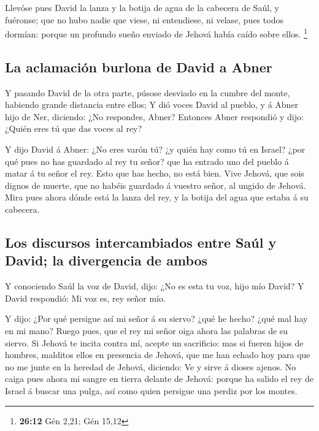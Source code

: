  Llevóse pues David la lanza y la botija de agua de la
cabecera de Saúl, y fuéronse; que no hubo nadie que viese, ni
entendiese, ni velase, pues todos dormían: porque un profundo sueño
enviado de Jehová había caído sobre ellos. \footnote{\textbf{26:12} Gén
  2,21; Gén 15,12}

\hypertarget{la-aclamaciuxf3n-burlona-de-david-a-abner}{%
\subsection{La aclamación burlona de David a
Abner}\label{la-aclamaciuxf3n-burlona-de-david-a-abner}}

 Y pasando David de la otra parte, púsose desviado en la
cumbre del monte, habiendo grande distancia entre ellos;  Y
dió voces David al pueblo, y á Abner hijo de Ner, diciendo: ¿No
respondes, Abner? Entonces Abner respondió y dijo: ¿Quién eres tú que
das voces al rey?

 Y dijo David á Abner: ¿No eres varón tú? ¿y quién hay como
tú en Israel? ¿por qué pues no has guardado al rey tu señor? que ha
entrado uno del pueblo á matar á tu señor el rey.  Esto que
has hecho, no está bien. Vive Jehová, que sois dignos de muerte, que no
habéis guardado á vuestro señor, al ungido de Jehová. Mira pues ahora
dónde está la lanza del rey, y la botija del agua que estaba á su
cabecera.

\hypertarget{los-discursos-intercambiados-entre-sauxfal-y-david-la-divergencia-de-ambos}{%
\subsection{Los discursos intercambiados entre Saúl y David; la
divergencia de
ambos}\label{los-discursos-intercambiados-entre-sauxfal-y-david-la-divergencia-de-ambos}}

 Y conociendo Saúl la voz de David, dijo: ¿No es esta tu
voz, hijo mío David? Y David respondió: Mi voz es, rey señor mío.

 Y dijo: ¿Por qué persigue así mi señor á su siervo? ¿qué
he hecho? ¿qué mal hay en mi mano?  Ruego pues, que el rey
mi señor oiga ahora las palabras de su siervo. Si Jehová te incita
contra mí, acepte un sacrificio: mas si fueren hijos de hombres,
malditos ellos en presencia de Jehová, que me han echado hoy para que no
me junte en la heredad de Jehová, diciendo: Ve y sirve á dioses ajenos.
 No caiga pues ahora mi sangre en tierra delante de Jehová:
porque ha salido el rey de Israel á buscar una pulga, así como quien
persigue una perdiz por los montes.

